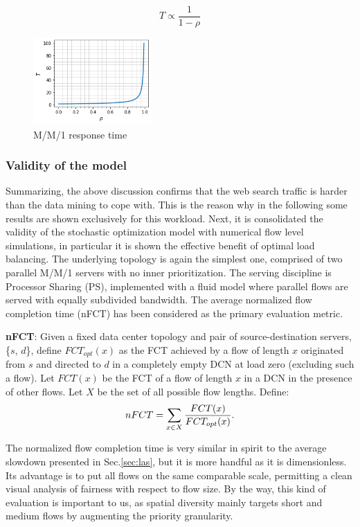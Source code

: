 \[
T \propto \dfrac{1}{1-\rho}
\]
\begin{figure}
	\centering
	\includegraphics[width=0.4\textwidth]{ChapterSpatialDiversityFramework/Figures/mm1-response-time}
	\caption{M/M/1 response time}
	\label{fig:mm1-responsetime}
\end{figure}
\subsubsection{Validity of the model}
Summarizing, the above discussion confirms that the web search traffic is harder than the data mining to cope with. This is the reason why in the following some results are shown exclusively for this workload. 
Next, it is consolidated the validity of the stochastic optimization model with numerical flow level simulations, in particular it is shown the effective benefit of optimal load balancing. The underlying topology is again the simplest one, comprised of two parallel M/M/1 servers with no inner prioritization. The serving discipline is Processor Sharing (PS), implemented with a fluid model where parallel flows are served with equally subdivided bandwidth. 
The average normalized flow completion time (nFCT) has been considered as the primary evaluation metric.
\smallskip
\begin{tcolorbox}[title=Definition]
	\textbf{nFCT}: Given a fixed data center topology and pair of source-destination servers, \{$s$, $d$\}, define $FCT_{opt}(x)$ as the FCT achieved by a flow of length $x$ originated from $s$ and directed to $d$ in a completely empty DCN at load zero (excluding such a flow). Let $FCT(x)$ be the FCT of a flow of length $x$ in a DCN in the presence of other flows. Let $X$ be the set of all possible flow lengths. Define:
	\[
	nFCT = \sum_{x \in X} \small \frac{FCT(x)}{FCT_{opt}(x)} \normalsize.
	\]
\end{tcolorbox}
\smallskip
The normalized flow completion time is very similar in spirit to the average slowdown presented in Sec.\ref{sec:las}, but it is more handful as it is dimensionless. Its advantage is to put all flows on the same comparable scale, permitting a clean visual analysis of fairness with respect to flow size. By the way, this kind of evaluation is important to us, as spatial diversity mainly targets short and medium flows by augmenting the priority granularity. \\

